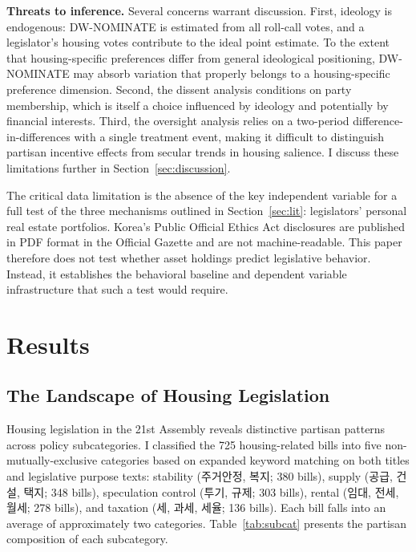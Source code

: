 \documentclass[11pt]{article}
\begin{document}
\textbf{Threats to inference.} Several concerns warrant discussion. First, ideology is endogenous: DW-NOMINATE is estimated from all roll-call votes, and a legislator's housing votes contribute to the ideal point estimate. To the extent that housing-specific preferences differ from general ideological positioning, DW-NOMINATE may absorb variation that properly belongs to a housing-specific preference dimension. Second, the dissent analysis conditions on party membership, which is itself a choice influenced by ideology and potentially by financial interests. Third, the oversight analysis relies on a two-period difference-in-differences with a single treatment event, making it difficult to distinguish partisan incentive effects from secular trends in housing salience. I discuss these limitations further in Section~\ref{sec:discussion}.

The critical data limitation is the absence of the key independent variable for a full test of the three mechanisms outlined in Section~\ref{sec:lit}: legislators' personal real estate portfolios. Korea's Public Official Ethics Act disclosures are published in PDF format in the Official Gazette and are not machine-readable. This paper therefore does not test whether asset holdings predict legislative behavior. Instead, it establishes the behavioral baseline and dependent variable infrastructure that such a test would require.


\section{Results}
\label{sec:results}

\subsection{The Landscape of Housing Legislation}

Housing legislation in the 21st Assembly reveals distinctive partisan patterns across policy subcategories. I classified the 725 housing-related bills into five non-mutually-exclusive categories based on expanded keyword matching on both titles and legislative purpose texts: stability (주거안정, 복지; 380 bills), supply (공급, 건설, 택지; 348 bills), speculation control (투기, 규제; 303 bills), rental (임대, 전세, 월세; 278 bills), and taxation (세, 과세, 세율; 136 bills). Each bill falls into an average of approximately two categories. Table~\ref{tab:subcat} presents the partisan composition of each subcategory.
\end{document}
